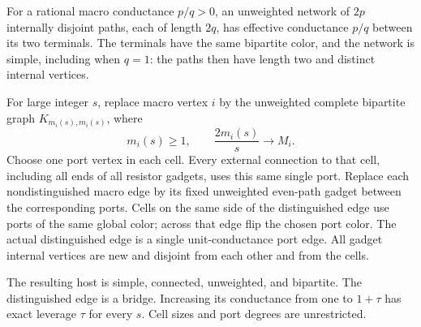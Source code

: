 \documentclass[11pt]{article}
\begin{document}
For a rational macro conductance $p/q>0$, an unweighted network of
$2p$ internally disjoint paths, each of length $2q$, has effective
conductance $p/q$ between its two terminals. The terminals have the
same bipartite color, and the network is simple, including when $q=1$:
the paths then have length two and distinct internal vertices.

For large integer $s$, replace macro vertex $i$ by the unweighted
complete bipartite graph $K_{m_i(s),m_i(s)}$, where
\[
 m_i(s)\ge1,\qquad \frac{2m_i(s)}s\longrightarrow M_i.
\]
Choose one port vertex in each cell. Every external connection to
that cell, including all ends of all resistor gadgets, uses this
same single port. Replace each nondistinguished macro edge by its
fixed unweighted even-path gadget between the corresponding ports.
Cells on the same side of the distinguished edge use ports of the
same global color; across that edge flip the chosen port color.
The actual distinguished edge is a single unit-conductance port edge.
All gadget internal vertices are new and disjoint from each other and
from the cells.

The resulting host is simple, connected, unweighted, and bipartite.
The distinguished edge is a bridge. Increasing its conductance from
one to $1+\tau$ has exact leverage $\tau$ for every $s$.
Cell sizes and port degrees are unrestricted.
\end{document}
